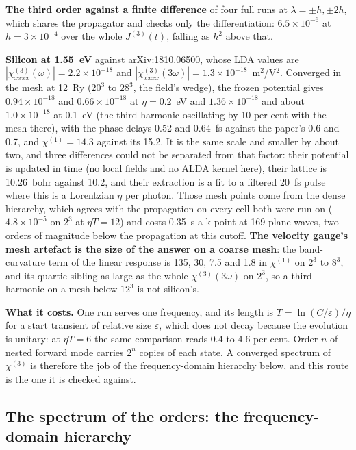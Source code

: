 \documentclass[11pt,a4paper]{article}
\begin{document}
\textbf{The third order against a finite difference} of four full runs at
$\lambda = \pm h, \pm2h$, which shares the propagator and checks only the
differentiation: $6.5\times10^{-6}$ at $h = 3\times10^{-4}$ over the whole
$J^{(3)}(t)$, falling as $h^2$ above that.

\textbf{Silicon at 1.55~eV} against arXiv:1810.06500, whose LDA values are
$|\chi^{(3)}_{xxxx}(\omega)| = 2.2\times10^{-18}$ and
$|\chi^{(3)}_{xxxx}(3\omega)| = 1.3\times10^{-18}$~m$^2$/V$^2$. Converged in the
mesh at 12~Ry ($20^3$ to $28^3$, the field's wedge), the frozen potential gives
$0.94\times10^{-18}$ and $0.66\times10^{-18}$ at $\eta = 0.2$~eV and
$1.36\times10^{-18}$ and about $1.0\times10^{-18}$ at 0.1~eV (the third harmonic
oscillating by 10 per cent with the mesh there), with the phase delays 0.52 and
0.64~fs against the paper's 0.6 and 0.7, and $\chi^{(1)} = 14.3$ against its
15.2. It is the same scale and smaller by about two, and three differences
could not be separated from that factor: their potential is updated in time (no
local fields and no ALDA kernel here), their lattice is 10.26~bohr against 10.2,
and their extraction is a fit to a filtered 20~fs pulse where this is a
Lorentzian $\eta$ per photon. Those mesh points come from the dense hierarchy,
which agrees with the propagation on every cell both were run on
($4.8\times10^{-5}$ on $2^3$ at $\eta T = 12$) and costs 0.35~s a k-point at
169 plane waves, two orders of magnitude below the propagation at this cutoff.
\textbf{The velocity gauge's mesh artefact is the size of the answer on a coarse
mesh}: the band-curvature term of the linear response is 135, 30, 7.5 and 1.8 in
$\chi^{(1)}$ on $2^3$ to $8^3$, and its quartic sibling as large as the whole
$\chi^{(3)}(3\omega)$ on $2^3$, so a third harmonic on a mesh below $12^3$ is not
silicon's.

\textbf{What it costs.} One run serves one frequency, and its length is
$T = \ln(C/\varepsilon)/\eta$ for a start transient of relative size
$\varepsilon$, which does not decay because the evolution is unitary: at
$\eta T = 6$ the same comparison reads 0.4 to 4.6 per cent. Order $n$ of nested
forward mode carries $2^n$ copies of each state. A converged spectrum of
$\chi^{(3)}$ is therefore the job of the frequency-domain hierarchy below, and
this route is the one it is checked against.

\subsection{The spectrum of the orders: the frequency-domain hierarchy}
\end{document}

